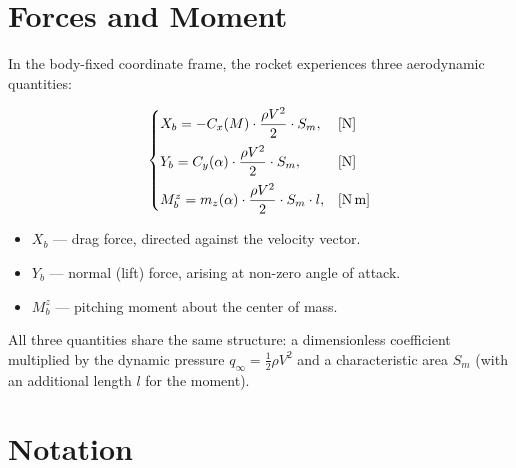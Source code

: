 \documentclass[11pt,a4paper]{article}
\begin{document}
\section{Forces and Moment}

In the body-fixed coordinate frame, the rocket experiences three aerodynamic quantities:

\begin{equation}
  \begin{cases}
    X_b = -C_x(M)\cdot\dfrac{\rho V^2}{2}\cdot S_m, & \text{[N]} \\[8pt]
    Y_b = C_y(\alpha)\cdot\dfrac{\rho V^2}{2}\cdot S_m, & \text{[N]} \\[8pt]
    M_b^z = m_z(\alpha)\cdot\dfrac{\rho V^2}{2}\cdot S_m\cdot l, & \text{[N\,m]}
  \end{cases}
\end{equation}

\begin{itemize}
  \item \textbf{$X_b$} --- drag force, directed against the velocity vector.
  \item \textbf{$Y_b$} --- normal (lift) force, arising at non-zero angle of attack.
  \item \textbf{$M_b^z$} --- pitching moment about the center of mass.
\end{itemize}

All three quantities share the same structure: a dimensionless coefficient multiplied by the dynamic pressure $q_\infty = \tfrac{1}{2}\rho V^2$ and a characteristic area $S_m$ (with an additional length $l$ for the moment).

\section{Notation}
\end{document}
